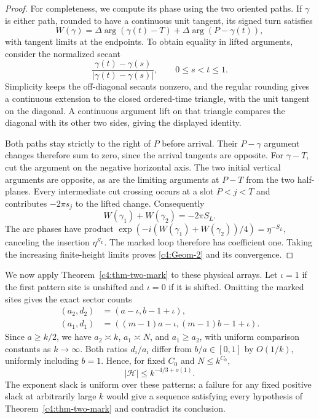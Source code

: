 \begin{proof}
For completeness, we compute its phase using the two oriented paths.
If $\gamma$ is either path, rounded to have a continuous unit tangent,
its signed turn satisfies
\[
 W(\gamma)=\Delta\arg(\gamma(t)-T)
                +\Delta\arg(P-\gamma(t)),
\]
with tangent limits at the endpoints. To obtain equality in lifted
arguments, consider the normalized secant
\[
 \frac{\gamma(t)-\gamma(s)}{|\gamma(t)-\gamma(s)|},
                    \qquad 0\le s<t\le1.
\]
Simplicity keeps the off-diagonal secants nonzero, and the regular
rounding gives a continuous extension to the closed ordered-time
triangle, with the unit tangent on the diagonal. A continuous argument
lift on that triangle compares the diagonal with its other two sides, giving
the displayed identity.

Both paths stay strictly to the right of $P$ before arrival. Their
$P-\gamma$ argument changes therefore sum to zero, since the arrival
tangents are opposite. For $\gamma-T$, cut the argument on the negative
horizontal axis. The two initial vertical arguments are opposite, as
are the limiting arguments at $P-T$ from the two half-planes. Every
intermediate cut crossing occurs at a slot $P<j<T$ and contributes
$-2\pi s_j$ to the lifted change. Consequently
\[
 W(\gamma_1)+W(\gamma_2)=-2\pi S_L.
\]
The arc phases have product $\exp(-i(W(\gamma_1)+W(\gamma_2))/4)
=\eta^{-S_L}$, canceling the insertion $\eta^{S_L}$. The marked loop
therefore has coefficient one. Taking the increasing finite-height
limits proves \eqref{c4:Geom-2} and its convergence.
\end{proof}

We now apply Theorem~\ref{c4:thm-two-mark} to these physical arrays.
Let $\iota=1$ if the first pattern site is unshifted and $\iota=0$ if it is
shifted. Omitting the marked sites gives the exact sector counts
\[
 \begin{aligned}
 (a_2,d_2)&=(a-\iota,b-1+\iota),\\
 (a_1,d_1)&=((m-1)a-\iota,(m-1)b-1+\iota).
 \end{aligned}
\]
Since $a\ge k/2$, we have $a_2\asymp k$, $a_1\asymp N$, and
$a_1\ge a_2$, with uniform comparison constants as $k\to\infty$.
Both ratios $d_i/a_i$ differ from $b/a\in[0,1]$ by $O(1/k)$,
uniformly including $b=1$. Hence, for fixed $C_0$ and $N\le k^{C_0}$,
\begin{equation}
                        |\mathscr H|\le k^{-4/3+o(1)}.                \label{c4:Geom-1}
\end{equation}
The exponent slack is uniform over these patterns: a failure for any
fixed positive slack at arbitrarily large $k$ would give a sequence
satisfying every hypothesis of Theorem~\ref{c4:thm-two-mark} and
contradict its conclusion.

